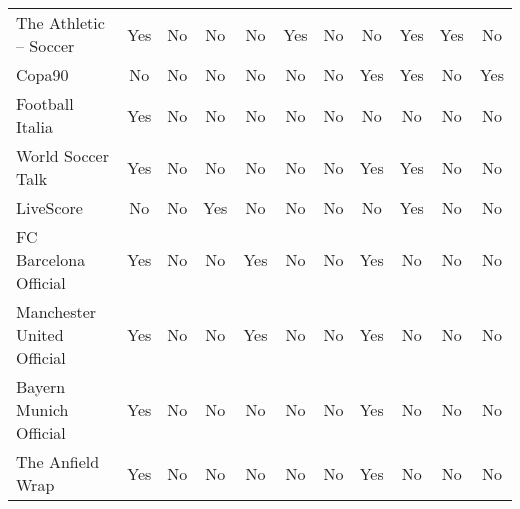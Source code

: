 \begin{table}[h!]
\begin{tabular}{|l|c|c|c|c|c|c|c|c|c|c|}
The Athletic – Soccer & Yes                    & No                  & No              & No                   & Yes                   & No                    & No                 & Yes                 & Yes                 & No                   \\
Copa90                & No                     & No                  & No              & No                   & No                    & No                    & Yes                & Yes                 & No                  & Yes                  \\
Football Italia       & Yes                    & No                  & No              & No                   & No                    & No                    & No                 & No                  & No                  & No                   \\
World Soccer Talk     & Yes                    & No                  & No              & No                   & No                    & No                    & Yes                & Yes                 & No                  & No                   \\
LiveScore             & No                     & No                  & Yes             & No                   & No                    & No                    & No                 & Yes                 & No                  & No                   \\
FC Barcelona Official & Yes                    & No                  & No              & Yes                  & No                    & No                    & Yes                & No                  & No                  & No                   \\
Manchester United Official & Yes               & No                  & No              & Yes                  & No                    & No                    & Yes                & No                  & No                  & No                   \\
Bayern Munich Official & Yes                   & No                  & No              & No                   & No                    & No                    & Yes                & No                  & No                  & No                   \\
The Anfield Wrap      & Yes                    & No                  & No              & No                   & No                    & No                    & Yes                & No                  & No                  & No                   \\

\end{tabular}
\end{table}
